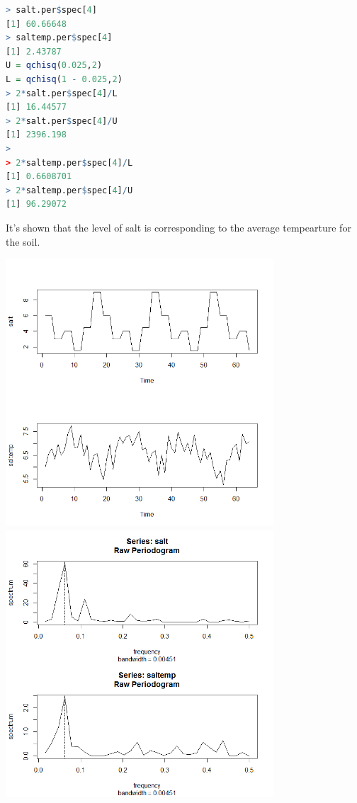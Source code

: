\documentclass{article}
\begin{document}
\begin{CJK*}{GBK}{song}
\begin{lstlisting}[language=R,keywordstyle=\color{blue!70},commentstyle=\color{red!50!green!50!blue!50},frame=single,rulesepcolor=\color{red!20!green!20!blue!20},backgroundcolor=\color{backcolour},
]
> salt.per$spec[4]
[1] 60.66648
> saltemp.per$spec[4]
[1] 2.43787
U = qchisq(0.025,2)
L = qchisq(1 - 0.025,2)
> 2*salt.per$spec[4]/L
[1] 16.44577
> 2*salt.per$spec[4]/U
[1] 2396.198
> 
> 2*saltemp.per$spec[4]/L
[1] 0.6608701
> 2*saltemp.per$spec[4]/U
[1] 96.29072
\end{lstlisting}
It's shown that the level of salt is corresponding to the average tempearture for the soil.
\begin{center}
\includegraphics[width=10cm]{2.png}
\includegraphics[width=10cm]{3.png}
\end{center}


\end{CJK*}
\end{document}
